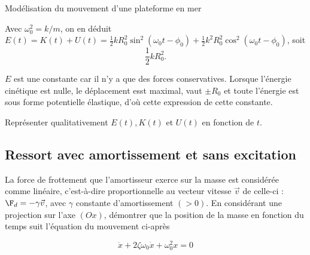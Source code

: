 \begin{exo}[PC][1][devoir]{Modélisation du mouvement d'une plateforme en mer}
\begin{quest}
{Avec $\omega_0^2=k/m$, on en déduit $E(t)=K(t)+U(t)=\frac{1}{2}kR^2_0\sin^2(\omega_0t-\phi_0)+\frac{1}{2}k^2R^2_0 \cos^2(\omega_0t - \phi_0)$, soit $$\boxed{\frac{1}{2}kR^2_0.}$$

  $E$ est une constante car il n'y a que des forces conservatives. Lorsque l'énergie cinétique est nulle, le déplacement esst maximal, vaut $\pm R_0$ et toute l'énergie est sous forme potentielle élastique, d'où cette expression de cette constante.
  }

  \item Représenter qualitativement $E(t), K(t)$ et $U(t)$ en fonction de $t$.
\end{quest}


  \subsection{Ressort avec amortissement et sans excitation}
  \begin{quest}
  \item La force de frottement que l'amortisseur exerce sur la masse est considérée comme linéaire, c'est-à-dire proportionnelle au vecteur vitesse $\Vec{v}$ de celle-ci : $\F_{d}=-\gamma \Vec{v}$, avec $\gamma$ constante d'amortissement $(>0)$. En considérant une projection sur l'axe $(Ox)$, démontrer que la position de la masse en fonction du temps suit l'équation du mouvement ci-après

  \begin{equation}
    \ddot{x}+2 \zeta \omega_{0} \dot{x}+\omega_{0}^{2} x= 0
  \end{equation}


\end{quest}
\end{exo}
